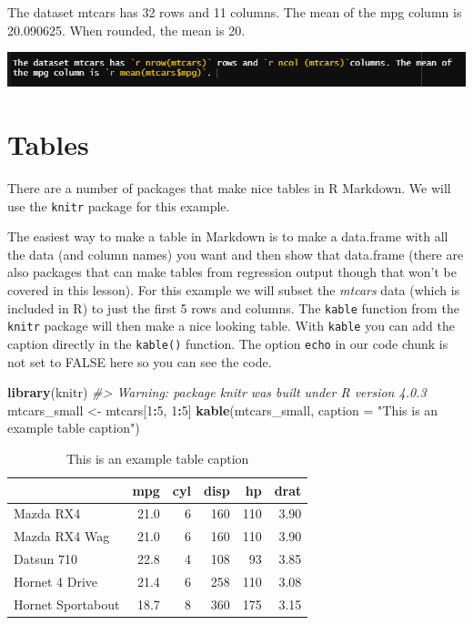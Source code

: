 \documentclass[
  12pt,
]{book}
\newenvironment{Shaded}{\begin{snugshade}}{\end{snugshade}}
\newcommand{\CommentTok}[1]{\textcolor[rgb]{0.37,0.37,0.37}{\textit{#1}}}
\newcommand{\DataTypeTok}[1]{\textcolor[rgb]{0.27,0.27,0.27}{#1}}
\newcommand{\DecValTok}[1]{\textcolor[rgb]{0.06,0.06,0.06}{#1}}
\newcommand{\KeywordTok}[1]{\textcolor[rgb]{0.27,0.27,0.27}{\textbf{#1}}}
\newcommand{\NormalTok}[1]{#1}
\newcommand{\OperatorTok}[1]{\textcolor[rgb]{0.43,0.43,0.43}{\textbf{#1}}}
\newcommand{\StringTok}[1]{\textcolor[rgb]{0.5,0.5,0.5}{#1}}
\begin{document}
The dataset mtcars has 32 rows and 11 columns. The mean of the mpg column is 20.090625. When rounded, the mean is 20.

\includegraphics{images/inline_code.PNG}

\hypertarget{tables}{%
\section{Tables}\label{tables}}

There are a number of packages that make nice tables in R Markdown. We will use the \texttt{knitr} package for this example.

The easiest way to make a table in Markdown is to make a data.frame with all the data (and column names) you want and then show that data.frame (there are also packages that can make tables from regression output though that won't be covered in this lesson). For this example we will subset the \emph{mtcars} data (which is included in R) to just the first 5 rows and columns. The \texttt{kable} function from the \texttt{knitr} package will then make a nice looking table. With \texttt{kable} you can add the caption directly in the \texttt{kable()} function. The option \texttt{echo} in our code chunk is not set to FALSE here so you can see the code.

\begin{Shaded}
\begin{Highlighting}[]
\KeywordTok{library}\NormalTok{(knitr)}
\CommentTok{\#\textgreater{} Warning: package \textquotesingle{}knitr\textquotesingle{} was built under R version 4.0.3}
\NormalTok{mtcars\_small \textless{}{-}}\StringTok{ }\NormalTok{mtcars[}\DecValTok{1}\OperatorTok{:}\DecValTok{5}\NormalTok{, }\DecValTok{1}\OperatorTok{:}\DecValTok{5}\NormalTok{]}
\KeywordTok{kable}\NormalTok{(mtcars\_small, }\DataTypeTok{caption =} \StringTok{"This is an example table caption"}\NormalTok{)}
\end{Highlighting}
\end{Shaded}

\begin{table}

\caption{\label{tab:unnamed-chunk-1}This is an example table caption}
\centering
\begin{tabular}[t]{l|r|r|r|r|r}
\hline
  & mpg & cyl & disp & hp & drat\\
\hline
Mazda RX4 & 21.0 & 6 & 160 & 110 & 3.90\\
\hline
Mazda RX4 Wag & 21.0 & 6 & 160 & 110 & 3.90\\
\hline
Datsun 710 & 22.8 & 4 & 108 & 93 & 3.85\\
\hline
Hornet 4 Drive & 21.4 & 6 & 258 & 110 & 3.08\\
\hline
Hornet Sportabout & 18.7 & 8 & 360 & 175 & 3.15\\
\hline
\end{tabular}
\end{table}
\end{document}
